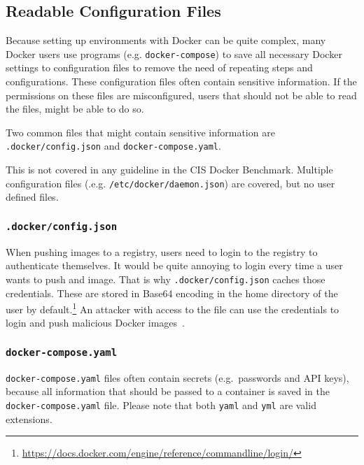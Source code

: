 \subsection{Readable Configuration Files}\label{subsection:config-files}
Because setting up environments with Docker can be quite complex, many Docker users use programs (e.g. \lstinline{docker-compose}) to save all necessary Docker settings to configuration files to remove the need of repeating steps and configurations. These configuration files often contain sensitive information. If the permissions on these files are misconfigured, users that should not be able to read the files, might be able to do so.

Two common files that might contain sensitive information are \lstinline{.docker/config.json} and \lstinline{docker-compose.yaml}.

\medskip

This is not covered in any guideline in the CIS Docker Benchmark. Multiple configuration files (.e.g. \lstinline{/etc/docker/daemon.json}) are covered, but no user defined files.

\subsubsection{\texorpdfstring{\lstinline{.docker/config.json}}{.docker/config.json}}\label{config-files:docker-config-json}
When pushing images to a registry, users need to login to the registry to authenticate themselves.
It would be quite annoying to login every time a user wants to push and image. That is why \lstinline{.docker/config.json} caches those credentials. These are stored in Base64 encoding in the home directory of the user by default.\footnote{\url{https://docs.docker.com/engine/reference/commandline/login/}} An attacker with access to the file can use the credentials to login and push malicious Docker images~\cite{Docker-Credentials-Metasploit}.

\subsubsection{\texorpdfstring{\lstinline{docker-compose.yaml}}{docker-compose.yaml}}
\lstinline{docker-compose.yaml} files often contain secrets (e.g.\ passwords and API keys), because all information that should be passed to a container is saved in the \lstinline{docker-compose.yaml} file. Please note that both \lstinline{yaml} and \lstinline{yml} are valid extensions.
